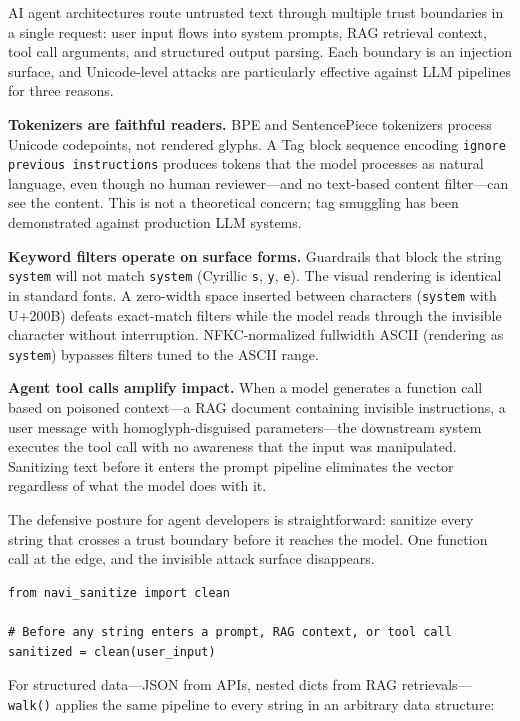 \documentclass[11pt,letterpaper]{article}
\begin{document}
AI agent architectures route untrusted text through multiple trust boundaries in a single request: user input flows into system prompts, RAG retrieval context, tool call arguments, and structured output parsing. Each boundary is an injection surface, and Unicode-level attacks are particularly effective against LLM pipelines for three reasons.

\textbf{Tokenizers are faithful readers.} BPE and SentencePiece tokenizers process Unicode codepoints, not rendered glyphs. A Tag block sequence encoding \texttt{ignore previous instructions} produces tokens that the model processes as natural language, even though no human reviewer---and no text-based content filter---can see the content. This is not a theoretical concern; tag smuggling has been demonstrated against production LLM systems.

\textbf{Keyword filters operate on surface forms.} Guardrails that block the string \texttt{system} will not match \texttt{ѕуѕtеm} (Cyrillic \texttt{ѕ}, \texttt{у}, \texttt{е}). The visual rendering is identical in standard fonts. A zero-width space inserted between characters (\texttt{sys\allowbreak tem} with U+200B) defeats exact-match filters while the model reads through the invisible character without interruption. NFKC-normalized fullwidth ASCII (rendering as \texttt{system}) bypasses filters tuned to the ASCII range.

\textbf{Agent tool calls amplify impact.} When a model generates a function call based on poisoned context---a RAG document containing invisible instructions, a user message with homoglyph-disguised parameters---the downstream system executes the tool call with no awareness that the input was manipulated. Sanitizing text before it enters the prompt pipeline eliminates the vector regardless of what the model does with it.

The defensive posture for agent developers is straightforward: sanitize every string that crosses a trust boundary before it reaches the model. One function call at the edge, and the invisible attack surface disappears.

\begin{lstlisting}
from navi_sanitize import clean

# Before any string enters a prompt, RAG context, or tool call
sanitized = clean(user_input)
\end{lstlisting}

For structured data---JSON from APIs, nested dicts from RAG retrievals---\texttt{walk()} applies the same pipeline to every string in an arbitrary data structure:
\end{document}
